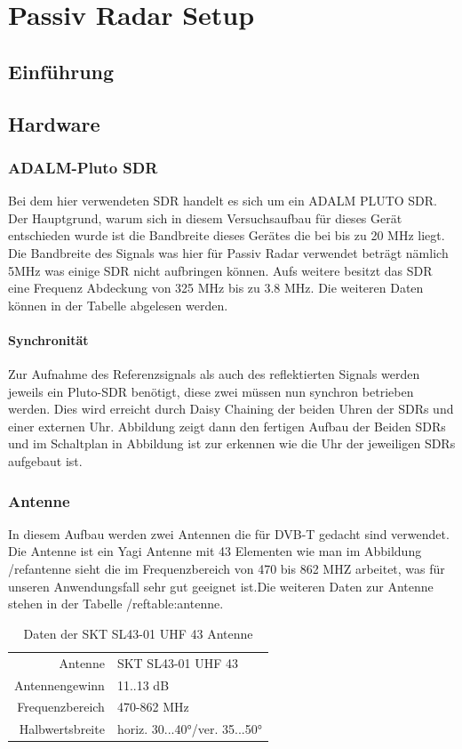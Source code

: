 \chapter{Passiv Radar Setup}
\section{Einführung}
\section{Hardware}
\subsection{ADALM-Pluto SDR}
Bei dem hier verwendeten SDR handelt es sich um ein ADALM
PLUTO SDR. Der Hauptgrund, warum sich in diesem Versuchsaufbau für dieses Gerät entschieden wurde ist die Bandbreite dieses Gerätes die bei bis zu 20 MHz liegt. Die Bandbreite des Signals was hier für Passiv Radar verwendet beträgt nämlich 5MHz was einige SDR nicht aufbringen können.  Aufs weitere besitzt das SDR eine Frequenz Abdeckung von 325 MHz bis zu 3.8 MHz. Die weiteren Daten können in der Tabelle abgelesen werden.

\subsubsection{Synchronität}
Zur Aufnahme des Referenzsignals als auch des reflektierten Signals werden jeweils ein Pluto-SDR benötigt, diese zwei müssen nun synchron betrieben werden. Dies wird erreicht durch Daisy Chaining  der beiden Uhren der SDRs und einer externen Uhr. Abbildung zeigt dann den fertigen Aufbau der Beiden SDRs und im Schaltplan in Abbildung ist zur erkennen wie die Uhr der jeweiligen SDRs aufgebaut ist.
\subsection{Antenne}
In diesem Aufbau werden zwei Antennen die für DVB-T gedacht sind verwendet. Die Antenne ist ein Yagi Antenne mit 43 Elementen wie man im Abbildung /ref{antenne} sieht die im Frequenzbereich von 470 bis 862 MHZ arbeitet, was für unseren Anwendungsfall sehr gut geeignet ist.Die weiteren Daten zur Antenne stehen in der Tabelle /ref{table:antenne}.

\begin{table}
    \centering
        \begin{tabular}[h]{rl}
            Antenne         & SKT SL43-01 UHF 43            \\
            Antennengewinn  & 11..13 dB                     \\
            Frequenzbereich & 470-862 MHz                   \\
            Halbwertsbreite & horiz. 30...40°/ver. 35...50° \\
        \end{tabular}
    \caption{Daten der SKT SL43-01 UHF 43 Antenne}\label{table:antenne}
\end{table}

